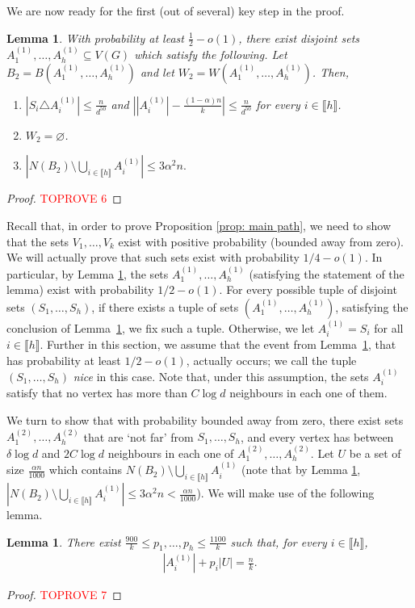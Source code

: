 \documentclass[notitlepage]{scrartcl}
\newcommand{\br}[1]{\llbracket{#1}\rrbracket}
\newtheorem{lemma}[thm]{Lemma}
\begin{document}
We are now ready for the first (out of several) key step in the proof.
\begin{lemma}\label{l: first LLL large degree}
With probability at least $\frac{1}{2}-o(1)$, there exist disjoint sets $A_1^{(1)},\ldots, A_h^{(1)}\subseteq V(G)$ which satisfy the following. Let $B_2=B\left(A_1^{(1)},\ldots, A_h^{(1)}\right)$ and let $W_2=W\left(A_1^{(1)},\ldots, A_h^{(1)}\right)$. Then,
\begin{enumerate}
    \item $\left|S_i\triangle A_i^{(1)}\right|\le \frac{n}{d^{50}}$ and $\left||A_i^{(1)}|-\frac{(1-\alpha)n}{k}\right|\le \frac{n}{d^{50}}$ for every $i\in \br{h}$.
    \item $W_2=\varnothing$.
    \item $\left|N(B_2)\setminus\bigcup_{i\in \br{h}} A_i^{(1)}\right|\le 3\alpha^2n.$
\end{enumerate}
\end{lemma}
\begin{proof}\textcolor{red}{TOPROVE 6}\end{proof}

Recall that, in order to prove Proposition \ref{prop: main path}, we need to show that the sets $V_1,\ldots, V_k$ exist with positive probability (bounded away from zero). We will actually prove that such sets exist with probability $1/4-o(1)$. In particular, by Lemma \ref{l: first LLL large degree}, the sets $A_1^{(1)},\ldots, A_h^{(1)}$ (satisfying the statement of the lemma) exist with probability $1/2-o(1)$. For every possible tuple of disjoint sets $(S_1,\ldots,S_h)$, if there exists a tuple of sets $(A_1^{(1)},\ldots,A_h^{(1)})$, satisfying the conclusion of Lemma~\ref{l: first LLL large degree}, we fix such a tuple. Otherwise, we let $A_i^{(1)}=S_i$ for all $i\in \br{h}$. Further in this section, we assume that the event from Lemma~\ref{l: first LLL large degree}, that has probability at least $1/2-o(1)$, actually occurs; we call the tuple $(S_1,\ldots,S_h)$ \emph{nice} in this case.
Note that, under this assumption, the sets $A_i^{(1)}$ satisfy that no vertex has more than $C\log d$ neighbours in each one of them.

We turn to show that with probability bounded away from zero, there exist sets $A_1^{(2)},\ldots,A_h^{(2)}$ that are `not far' from $S_1,\ldots, S_h$, and every vertex has between $\delta\log d$ and $2C\log d$ neighbours in each one of $A_1^{(2)},\ldots, A_h^{(2)}$. Let $U$ be a set of size $\frac{\alpha n}{1000}$ which contains $N(B_2)\setminus \bigcup_{i\in \br{h}}A_i^{(1)}$ (note that by Lemma \ref{l: first LLL large degree}, $\left|N(B_2)\setminus \bigcup_{i\in \br{h}}A_i^{(1)}\right|\le 3\alpha^2n<\frac{\alpha n}{1000}$). We will make use of the following lemma.
\begin{lemma}\label{l: sprinkling probability}
There exist $\frac{900}{k}\le p_1,\ldots, p_h\le \frac{1100}{k}$ such that, for every $i\in \br{h}$, 
\begin{align*}
    |A_i^{(1)}|+p_i|U|=\frac{n}{k}.
\end{align*}
\end{lemma}
\begin{proof}\textcolor{red}{TOPROVE 7}\end{proof}
\end{document}
